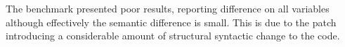 %
%
%

The  benchmark presented poor results, reporting difference on all variables although effectively the semantic difference is small. This is due to the patch introducing a considerable amount of structural syntactic change to the code.
